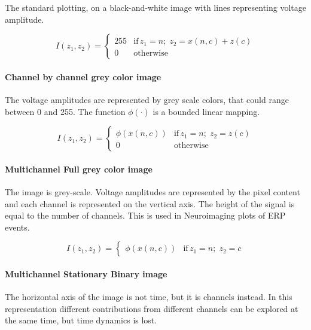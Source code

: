 The standard plotting, on a black-and-white image with lines representing voltage amplitude.

\begin{equation}
I(z_1,z_2) = \left\{ \begin{array}{rl}
255 & \text{if} \,  z_1 =  n; \; z_2 = x(n,c) + z(c) \\
0   & \mbox{otherwise}
\end{array}\right.
\label{eq:images}
\end{equation}

\paragraph{Channel by channel grey color image}

The voltage amplitudes are represented by grey scale colors, that could range between 0 and 255.  The function $\phi( \cdot )$ is a bounded linear mapping.

\begin{equation}
I(z_1,z_2) = \left\{ \begin{array}{rl}
\phi(x(n,c)) & \text{if} \,  z_1 = n; \; z_2 = z(c) \\
0   & \mbox{otherwise}
\end{array}\right.
\label{eq:images}
\end{equation}

\paragraph{Multichannel Full grey color image}

The image is grey-scale. Voltage amplitudes are represented by the pixel content and each channel is represented on the vertical axis.  The height of the signal is equal to the number of channels.   This is used in Neuroimaging plots of ERP events.

\begin{equation}
I(z_1,z_2) = \left\{ \begin{array}{rl} \phi(x(n,c))  & \text{if} \,  z_1 = n; \; z_2 = c \end{array}\right.
\label{eq:images}
\end{equation}


\paragraph{Multichannel Stationary Binary image}

The horizontal axis of the image is not time, but it is channels instead.   In this representation different contributions from different channels can be explored at the same time, but time dynamics is lost.  


